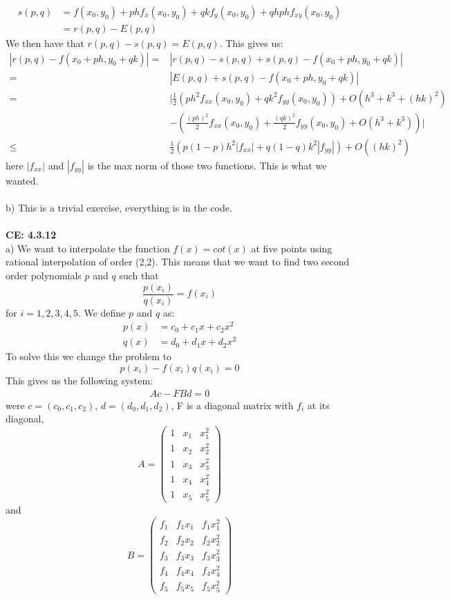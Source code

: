 \documentclass[11pt,a4paper]{report}
\begin{document}
\begin{align*}
s(p,q)&= f(x_0,y_0) + phf_x(x_0,y_0)+qkf_y(x_0,y_0)
+qhphf_{xy}(x_0,y_0) \\
&=r(p,q)-E(p,q)
\end{align*}
We then have that $r(p,q)-s(p,q)=E(p,q)$. This gives us:
\begin{align*}
|r(p,q)-f(x_0+ph,y_0+qk)| = &|r(p,q)-s(p,q)+s(p,q)-f(x_0+ph,y_0+qk)| \\
=&|E(p,q)+s(p,q)-f(x_0+ph,y_0+qk)| \\
=&|\frac{1}{2}(ph^2f_{xx}(x_0,y_0)+qk^2f_{yy}(x_0,y_0)) +O(h^3+k^3+(hk)^2)\\
&-(\frac{(ph)^2}{2}f_{xx}(x_0,y_0)+\frac{(qk)^2}{2}f_{yy}(x_0,y_0) +O(h^3+k^3))| \\
\leq &\frac{1}{2}(p(1-p)h^2|f_{xx}|+q(1-q)k^2|f_{yy}|)+ O((hk)^2)
\end{align*}
here $|f_{xx}|$ and $|f_{yy}|$ is the max norm of those two functions. This is what we wanted.
\\
\\
b) This is a trivial exercise, everything is in the code.
\\
\\
\textbf{CE: 4.3.12}
\\
a) We want to interpolate the function $f(x)=cot(x)$ at five points using rational interpolation of order (2,2). This means that we want to find two second order polynomials $p$ and $q$ such that $$\frac{p(x_i)}{q(x_i)}=f(x_i) $$ for $i=1,2,3,4,5$. We define $p$ and $q$ as: 
\begin{align*}
p(x) &= c_0+c_1x+c_2x^2 \\
q(x) &= d_0+d_1x+d_2x^2
\end{align*} 
To solve this we change the problem to $$p(x_i)-f(x_i)q(x_i)=0$$ This gives us the following system: 
\begin{align*}
Ac-FBd=0
\end{align*}
were $c=(c_0,c_1,c_2)$,  $d=(d_0,d_1,d_2)$, F is a diagonal matrix with $f_i$ at its diagonal,
$$ 
A = 
 \begin{pmatrix}
  1 & x_1 & x_1^2  \\
  1 & x_2 & x_2^2  \\
  1 & x_3 & x_3^2   \\
  1 & x_4 & x_4^2 \\
  1 & x_5 & x_5^2
 \end{pmatrix}
$$
and 
$$ 
B = 
 \begin{pmatrix}
  f_1 & f_1x_1 & f_1x_1^2  \\
  f_2 & f_2x_2 & f_2x_2^2  \\
  f_3 & f_3x_3 & f_3x_3^2   \\
  f_4 & f_4x_4 & f_4x_4^2 \\
  f_5 & f_5x_5 & f_5x_5^2
 \end{pmatrix}
$$
\end{document}
